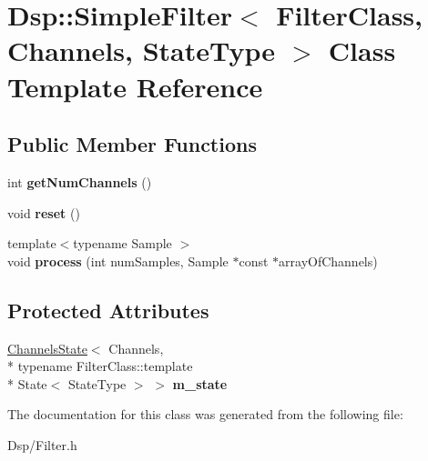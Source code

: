 \hypertarget{classDsp_1_1SimpleFilter}{\section{Dsp\-:\-:Simple\-Filter$<$ Filter\-Class, Channels, State\-Type $>$ Class Template Reference}
\label{classDsp_1_1SimpleFilter}
}
\subsection*{Public Member Functions}
\begin{DoxyCompactItemize}
\item 
\hypertarget{classDsp_1_1SimpleFilter_a5242e2b603be8be21bef4cd41de1f00a}{int {\bfseries get\-Num\-Channels} ()}\label{classDsp_1_1SimpleFilter_a5242e2b603be8be21bef4cd41de1f00a}

\item 
\hypertarget{classDsp_1_1SimpleFilter_a3e87b99bd56bfcf4dafe47b6caf6fe22}{void {\bfseries reset} ()}\label{classDsp_1_1SimpleFilter_a3e87b99bd56bfcf4dafe47b6caf6fe22}

\item 
\hypertarget{classDsp_1_1SimpleFilter_aab991206501bb9f64bb1cbaac4f46400}{{\footnotesize template$<$typename Sample $>$ }\\void {\bfseries process} (int num\-Samples, Sample $\ast$const $\ast$array\-Of\-Channels)}\label{classDsp_1_1SimpleFilter_aab991206501bb9f64bb1cbaac4f46400}

\end{DoxyCompactItemize}
\subsection*{Protected Attributes}
\begin{DoxyCompactItemize}
\item 
\hypertarget{classDsp_1_1SimpleFilter_a417e8a124a1288323830d33a8bdead2b}{\hyperlink{classDsp_1_1ChannelsState}{Channels\-State}$<$ Channels, \\*
typename Filter\-Class\-::template \\*
State$<$ State\-Type $>$ $>$ {\bfseries m\-\_\-state}}\label{classDsp_1_1SimpleFilter_a417e8a124a1288323830d33a8bdead2b}

\end{DoxyCompactItemize}


The documentation for this class was generated from the following file\-:\begin{DoxyCompactItemize}
\item 
Dsp/Filter.\-h\end{DoxyCompactItemize}
